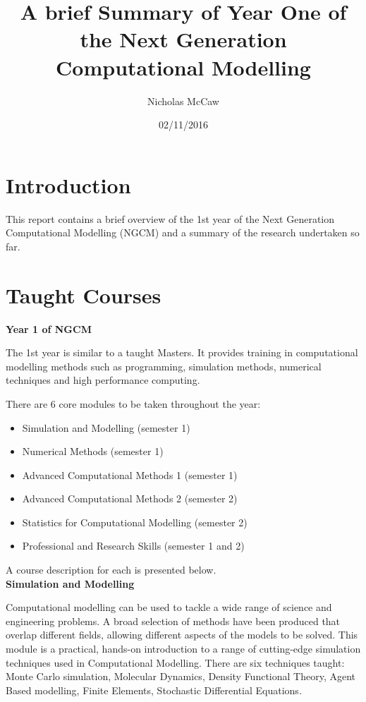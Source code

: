 \documentclass[12pt]{article}
\title{A brief Summary of Year One of the Next Generation Computational Modelling}
\author{Nicholas McCaw}
\date{02/11/2016}
\begin{document}
\maketitle

\section{Introduction}



This report contains a brief overview of the 1st year of the Next Generation Computational Modelling (NGCM) and a summary of the research undertaken so far.
\\

\section{Taught Courses}

\textbf{Year 1 of NGCM}

The 1st year is similar to a taught Masters. It provides training in computational modelling methods such as programming, simulation methods, numerical techniques and high performance computing. 

There are 6 core modules to be taken throughout the year:
\begin{itemize}

\item Simulation and Modelling (semester 1)

\item Numerical Methods (semester 1)

\item Advanced Computational Methods 1 (semester 1)

\item Advanced Computational Methods 2 (semester 2)

\item Statistics for Computational Modelling (semester 2)

\item Professional and Research Skills (semester 1 and 2)
\end{itemize}

A course description for each is presented below.
\\

\textbf{Simulation and Modelling}

Computational modelling can be used to tackle a wide range of science and engineering problems. A broad selection of methods have been produced that overlap different fields, allowing different aspects of the models to be solved. This module is a practical, hands-on introduction to a range of cutting-edge simulation techniques used in Computational Modelling. There are six techniques taught: Monte Carlo simulation, Molecular Dynamics, Density Functional Theory, Agent Based modelling, Finite Elements, Stochastic Differential Equations.
\\
\end{document}
